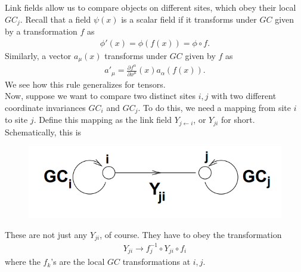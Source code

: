 \documentclass{book}
\theoremstyle{definition}
\newcommand{\p}{\partial}
\newcommand{\f}[2]{\frac{#1}{#2}}
\begin{document}
Link fields allow us to compare objects on different sites, which obey their local $GC_j$. Recall that a field $\psi(x)$ is a scalar field if it transforms under $GC$ given by a transformation $f$ as
\begin{align}
\phi'(x) = \phi(f(x)) = \phi \circ f.
\end{align}
Similarly, a vector $a_\mu(x)$ transforms under $GC$ given by $f$ as
\begin{align}
a'_\mu = \f{\p f^\alpha}{\p x^\mu}(x)a_\alpha(f(x)).
\end{align}
We see how this rule generalizes for tensors. \\

Now, suppose we want to compare two distinct sites $i,j$ with two different coordinate invariances $GC_i$ and $GC_j$. To do this, we need a mapping from site $i$ to site $j$. Define this mapping as the link field $Y_{j\leftarrow i}$, or $Y_{ji}$ for short. Schematically, this is 
\begin{figure}[!htb]
	\centering
	\includegraphics[scale=0.3]{link}
\end{figure}



These are not just any $Y_{ji}$, of course. They have to obey the transformation
\begin{align}
Y_{ji} \to f_j^{-1} \circ Y_{ji} \circ f_i
\end{align}
where the $f_k$'s are the local $GC$ transformations at $i,j$.\\
\end{document}
